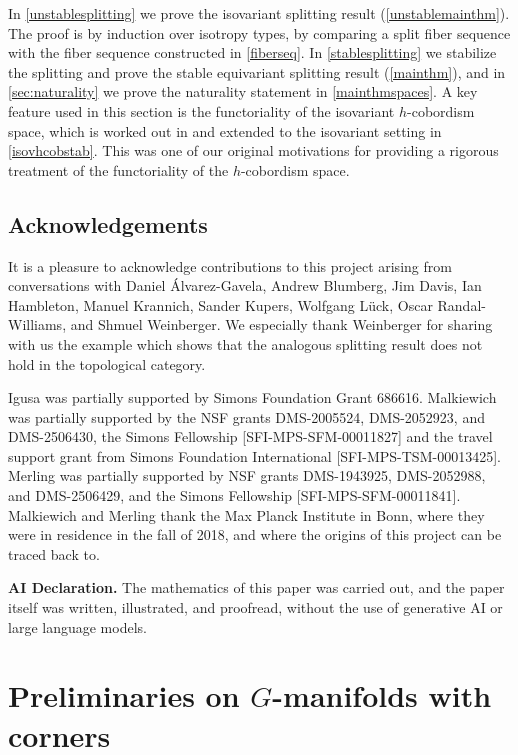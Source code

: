 \documentclass[11pt]{amsart}
\theoremstyle{definition}
\numberwithin{equation}{section}
\numberwithin{figure}{section}
\begin{document}
 In \autoref{unstablesplitting} we prove the isovariant splitting result (\autoref{unstablemainthm}). The proof is by induction over isotropy types, by comparing a split fiber sequence with the fiber sequence constructed in \autoref{fiberseq}. In \autoref{stablesplitting} we stabilize the splitting and prove the stable equivariant splitting result (\autoref{mainthm}), and in \autoref{sec:naturality} we prove the naturality statement in \autoref{mainthmspaces}. A key feature used in this section is the functoriality of the isovariant $h$-cobordism space, which is worked out in \cite{GIMM1} and extended to the isovariant setting in \autoref{isovhcobstab}. This was one of our original motivations for providing a rigorous treatment of the functoriality of the $h$-cobordism space.
 
 
 
\subsection{Acknowledgements}
 It is a pleasure to acknowledge contributions  to this project arising from conversations with Daniel \' Alvarez-Gavela, Andrew Blumberg, Jim Davis, Ian Hambleton, Manuel Krannich, Sander Kupers, Wolfgang L{\"u}ck, Oscar Randal-Williams,
and Shmuel Weinberger. We especially thank Weinberger for sharing with us the example which shows that the analogous splitting result does not hold in the topological category.

Igusa was partially supported by Simons Foundation Grant 686616. Malkiewich was partially supported by the NSF grants DMS-2005524, DMS-2052923, and DMS-2506430, the Simons Fellowship [SFI-MPS-SFM-00011827] and the travel support grant from Simons Foundation International [SFI-MPS-TSM-00013425]. Merling was partially supported by NSF grants DMS-1943925, DMS-2052988, and DMS-2506429, and the Simons Fellowship [SFI-MPS-SFM-00011841]. Malkiewich and Merling thank the Max Planck Institute in Bonn, where they were in residence in the fall of 2018, and where the origins of this project can be traced back to.


\noindent
\textbf{AI Declaration.}
	The mathematics of this paper was carried out, and the paper itself was written, illustrated, and proofread, without the use of generative AI or large language models.



\section{Preliminaries on $G$-manifolds with corners}\label{sec:preliminaries}
\end{document}
